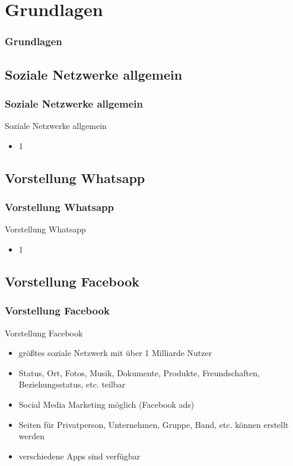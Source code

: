 \documentclass[xcolor=dvipsnames]{beamer}
\begin{document}
\section{Grundlagen}
\begin{frame} %
  \frametitle{Grundlagen} %
\end{frame}

\subsection{Soziale Netzwerke allgemein}
\begin{frame} %
  \frametitle{Soziale Netzwerke allgemein} %
  \begin{block}{Soziale Netzwerke allgemein}
	  \begin{itemize}
	  	\item 1
	  \end{itemize}
  \end{block}
\end{frame}


\subsection{Vorstellung Whatsapp}
\begin{frame} %
  \frametitle{Vorstellung Whatsapp} %
  \begin{block}{Vorstellung Whatsapp}
	  \begin{itemize}
	  	\item 1
	  \end{itemize}
  \end{block}
\end{frame}


\subsection{Vorstellung Facebook}
\begin{frame} %
  \frametitle{Vorstellung Facebook} %
  \begin{block}{Vorstellung Facebook}
	  \begin{itemize}
	  	\item größtes soziale Netzwerk mit über 1 Milliarde Nutzer
		\item Status, Ort, Fotos, Musik, Dokumente, Produkte, Freundschaften, Beziehungsstatus, etc. teilbar
		\item Social Media Marketing möglich (Facebook ads)
		\item Seiten für Privatperson, Unternehmen, Gruppe, Band, etc. können erstellt werden
		\item verschiedene Apps sind verfügbar
	  \end{itemize}
  \end{block}
\end{frame}
\end{document}
